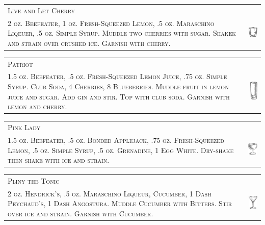 \documentclass{article}
\begin{document}
\begin{tabular}{b{2.5in} m{0.625in}}
  \multicolumn{2}{p{3.5in}}{\centering\Huge\textsc{Live and Let Cherry}} \\ 
  \textsc{2 oz. Beefeater, 1 oz. Fresh-Squeezed Lemon, .5 oz. Maraschino Liqeuer,
  .5 oz. Simple Syrup. Muddle two cherries with sugar. Shakek and strain over
  crushed ice. Garnish with cherry.} &
  \includegraphics[width=0.5in]{rocks_glass.png}
\end{tabular}

\begin{tabular}{b{2.5in} m{0.625in}}
  \multicolumn{2}{p{3.5in}}{\centering\Huge\textsc{Patriot}} \\ 
  \textsc{1.5 oz. Beefeater, .5 oz. Fresh-Squeezed Lemon Juice, .75 oz.
  Simple Syrup. Club Soda, 4 Cherries, 8 Blueberries. Muddle fruit in lemon juice
  and sugar. Add gin and stir. Top with club soda. Garnish with lemon and cherry.} &
  \includegraphics[width=0.5in]{collins.png}
\end{tabular}

\begin{tabular}{b{2.5in} m{0.625in}}
  \multicolumn{2}{p{3.5in}}{\centering\Huge\textsc{Pink Lady}} \\ 
  \textsc{1.5 oz. Beefeater, .5 oz. Bonded Applejack, .75 oz. Fresh-Squeezed
  Lemon, .5 oz. Simple Syrup, .5 oz. Grenadine, 1 Egg White.
  Dry-shake then shake with ice and strain.} &
  \includegraphics[width=0.5in]{coupe.png}
\end{tabular}

\begin{tabular}{b{2.5in} m{0.625in}}
  \multicolumn{2}{p{3.5in}}{\centering\Huge\textsc{Pliny the Tonic}} \\ 
  \textsc{2 oz. Hendrick's, .5 oz. Maraschino Liqueur, Cucumber, 1 Dash
  Peychaud's, 1 Dash Angostura. Muddle Cucumber with Bitters. Stir
  over ice and strain. Garnish with Cucumber.} &
  \includegraphics[width=0.5in]{goblet.png}
\end{tabular}
\end{document}
